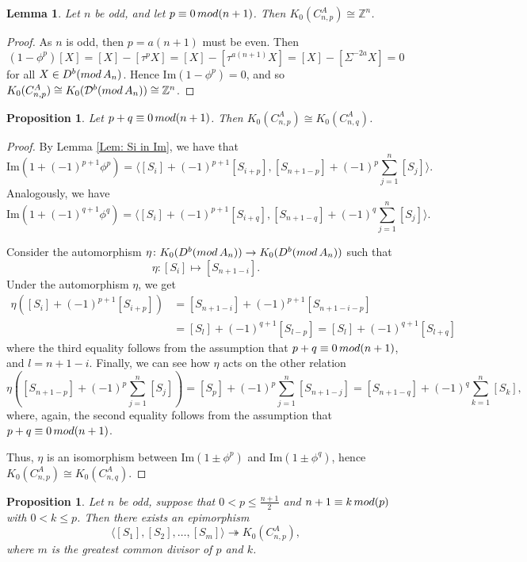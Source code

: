 \documentclass[a4paper,reqno,11pt]{amsart}
\newtheorem{lemma}[theorem]{Lemma}
\newtheorem{proposition}[theorem]{Proposition}
\theoremstyle{definition}
\def\D{\mathcal{D}}
\renewcommand{\mod}{\mathop{\rm mod}\nolimits}%
\begin{document}
\begin{lemma}\label{Lem: n odd, p equiv 0}
	Let $n$ be odd, and let $p \equiv 0 \mod (n+1)$.
	Then $K_0(C_{n,p}^A) \cong \mathbb{Z}^n$.
\end{lemma}

\begin{proof}
	As $n$ is odd, then $p = a(n+1)$ must be even.
	Then $$(1 - \phi^p) [X] = [X] - [\tau^p X] = [X] - [\tau^{a(n+1)} X] = [X] - [\Sigma^{-2a} X] =0$$ for all $X \in D^b(\mod {A_n})$.
	Hence $\mathrm{Im}(1 - \phi^p) =0$, and so $K_0(C_{n,p}^A) \cong K_0(\D^b(\mod {A_n})) \cong \mathbb{Z}^n$.
\end{proof}

\begin{proposition}\label{Prop: n odd, p+q equiv 0}
	Let $p+q \equiv 0 \mod (n+1)$. Then $K_0(C_{n,p}^A) \cong K_0(C_{n,q}^A)$.
\end{proposition}

\begin{proof}
	By Lemma \ref{Lem: Si in Im}, we have that
	\[
	\mathrm{Im}(1 +(-1)^{p+1} \phi^p) = \langle [S_i] + (-1)^{p+1} [S_{i+p}], [S_{n+1-p}] + (-1)^p \sum_{j=1}^n [S_j] \rangle.
	\]
	Analogously, we have
	\[
	\mathrm{Im}(1 +(-1)^{q+1} \phi^q) = \langle [S_i] + (-1)^{p+1} [S_{i+q}], [S_{n+1-q}] + (-1)^q \sum_{j=1}^n [S_j] \rangle.
	\]
	
	Consider the automorphism $\eta \colon K_0(D^b(\mod {A_n})) \rightarrow K_0(D^b(\mod {A_n}))$ such that $$\eta \colon [S_i] \mapsto [S_{n+1-i}].$$
	Under the automorphism $\eta$, we get
$$
\begin{aligned}
\eta([S_i] +(-1)^{p+1} [S_{i+p}]) &= [S_{n+1-i}] +(-1)^{p+1} [S_{n+1-i-p}]\\
 &= [S_l] +(-1)^{q+1} [S_{l-p}] = [S_l] +(-1)^{q+1} [S_{l+q}]
\end{aligned}
$$
where the third equality follows from the assumption that $p+q \equiv 0 \mod (n+1)$, and $l= n+1-i$.
	Finally, we can see how $\eta$ acts on the other relation
	\[
	\eta([S_{n+1-p}] +(-1)^p \sum_{j=1}^n [S_j]) = [S_{p}] +(-1)^p \sum_{j=1}^n [S_{n+1-j}] = [S_{n+1-q}] +(-1)^q \sum_{k=1}^n [S_k],
	\]
	where, again, the second equality follows from the assumption that $p+q \equiv 0 \mod (n+1)$.
	
	Thus, $\eta$ is an isomorphism between $\mathrm{Im}(1 \pm \phi^p)$ and $\mathrm{Im}(1 \pm \phi^q)$, hence  $K_0(C_{n,p}^A) \cong K_0(C_{n,q}^A)$.
\end{proof}

\begin{proposition}\label{Prop: n odd, epi to K0}
	Let $n$ be odd, suppose that $0 < p \leq \frac{n+1}{2}$ and $n+1 \equiv k \mod (p)$ with $0 < k \leq p$.
	Then there exists an epimorphism
	\[
	\langle [S_1], [S_2],\ldots, [S_m] \rangle \twoheadrightarrow K_0(C_{n,p}^A),
	\]
	where $m$ is the greatest common divisor of $p$ and $k$.
\end{proposition}
\end{document}
